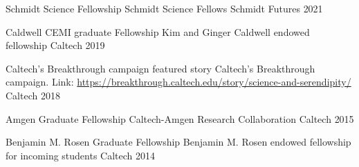 


\begin{cvhonors}

  \cvhonor
    {Schmidt Science Fellowship} %
    {Schmidt Science Fellows} %
    {Schmidt Futures} %
    {2021} %



  \cvhonor
    {Caldwell CEMI graduate Fellowship} %
    {Kim and Ginger Caldwell endowed fellowship} %
    {Caltech} %
    {2019} %

  \cvhonor
    {Caltech's Breakthrough campaign featured story}
    {Caltech's Breakthrough campaign. Link:
    \url{https://breakthrough.caltech.edu/story/science-and-serendipity/}} %
    {Caltech} %
    {2018} %

  \cvhonor
    {Amgen Graduate Fellowship} %
    {Caltech-Amgen Research Collaboration} %
    {Caltech} %
    {2015} %

  \cvhonor
    {Benjamin M. Rosen Graduate Fellowship} %
    {Benjamin M. Rosen endowed fellowship for incoming students} %
    {Caltech} %
    {2014} %

\end{cvhonors}

